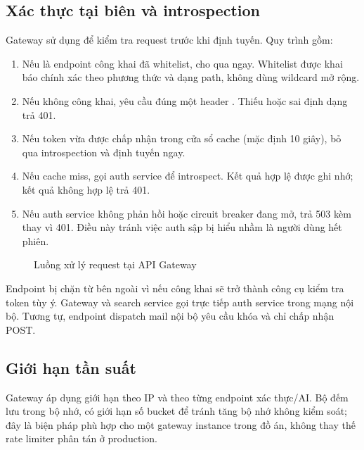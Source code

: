 \subsection{Xác thực tại biên và introspection}

Gateway sử dụng  để kiểm tra request trước khi định tuyến. Quy trình gồm:

\begin{enumerate}
  \item Nếu là endpoint công khai đã whitelist, cho qua ngay. Whitelist được khai báo chính xác theo phương thức và dạng path, không dùng wildcard mở rộng.
  \item Nếu không công khai, yêu cầu đúng một header . Thiếu hoặc sai định dạng trả 401.
  \item Nếu token vừa được chấp nhận trong cửa sổ cache (mặc định 10 giây), bỏ qua introspection và định tuyến ngay.
  \item Nếu cache miss, gọi auth service để introspect. Kết quả hợp lệ được ghi nhớ; kết quả không hợp lệ trả 401.
  \item Nếu auth service không phản hồi hoặc circuit breaker đang mở, trả 503 kèm  thay vì 401. Điều này tránh việc auth sập bị hiểu nhầm là người dùng hết phiên.
\end{enumerate}

\begin{figure}[H]
\centering
\resizebox{\textwidth}{!}{}
\caption{Luồng xử lý request tại API Gateway}
\label{fig:gateway-pipeline}
\end{figure}

Endpoint  bị chặn từ bên ngoài vì nếu công khai sẽ trở thành công cụ kiểm tra token tùy ý. Gateway và search service gọi trực tiếp auth service trong mạng nội bộ. Tương tự, endpoint dispatch mail nội bộ yêu cầu khóa  và chỉ chấp nhận POST.

\subsection{Giới hạn tần suất}

Gateway áp dụng giới hạn theo IP và theo từng endpoint xác thực/AI. Bộ đếm lưu trong bộ nhớ, có giới hạn số bucket để tránh tăng bộ nhớ không kiểm soát; đây là biện pháp phù hợp cho một gateway instance trong đồ án, không thay thế rate limiter phân tán ở production.

